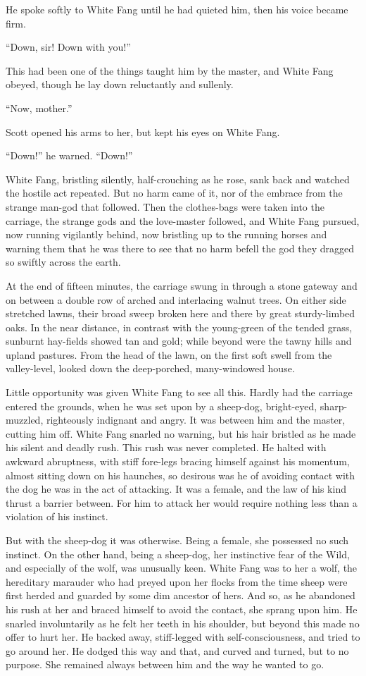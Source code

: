 \documentclass[10pt]{book}
\begin{document}
He spoke softly to White Fang until he had quieted him, then his voice
became firm.

“Down, sir! Down with you!”

This had been one of the things taught him by the master, and White
Fang obeyed, though he lay down reluctantly and sullenly.

“Now, mother.”

Scott opened his arms to her, but kept his eyes on White Fang.

“Down!” he warned. “Down!”

White Fang, bristling silently, half-crouching as he rose, sank back
and watched the hostile act repeated. But no harm came of it, nor of
the embrace from the strange man-god that followed. Then the
clothes-bags were taken into the carriage, the strange gods and the
love-master followed, and White Fang pursued, now running vigilantly
behind, now bristling up to the running horses and warning them that he
was there to see that no harm befell the god they dragged so swiftly
across the earth.

At the end of fifteen minutes, the carriage swung in through a stone
gateway and on between a double row of arched and interlacing walnut
trees. On either side stretched lawns, their broad sweep broken here
and there by great sturdy-limbed oaks. In the near distance, in
contrast with the young-green of the tended grass, sunburnt hay-fields
showed tan and gold; while beyond were the tawny hills and upland
pastures. From the head of the lawn, on the first soft swell from the
valley-level, looked down the deep-porched, many-windowed house.

Little opportunity was given White Fang to see all this. Hardly had the
carriage entered the grounds, when he was set upon by a sheep-dog,
bright-eyed, sharp-muzzled, righteously indignant and angry. It was
between him and the master, cutting him off. White Fang snarled no
warning, but his hair bristled as he made his silent and deadly rush.
This rush was never completed. He halted with awkward abruptness, with
stiff fore-legs bracing himself against his momentum, almost sitting
down on his haunches, so desirous was he of avoiding contact with the
dog he was in the act of attacking. It was a female, and the law of his
kind thrust a barrier between. For him to attack her would require
nothing less than a violation of his instinct.

But with the sheep-dog it was otherwise. Being a female, she possessed
no such instinct. On the other hand, being a sheep-dog, her instinctive
fear of the Wild, and especially of the wolf, was unusually keen. White
Fang was to her a wolf, the hereditary marauder who had preyed upon her
flocks from the time sheep were first herded and guarded by some dim
ancestor of hers. And so, as he abandoned his rush at her and braced
himself to avoid the contact, she sprang upon him. He snarled
involuntarily as he felt her teeth in his shoulder, but beyond this
made no offer to hurt her. He backed away, stiff-legged with
self-consciousness, and tried to go around her. He dodged this way and
that, and curved and turned, but to no purpose. She remained always
between him and the way he wanted to go.
\end{document}
